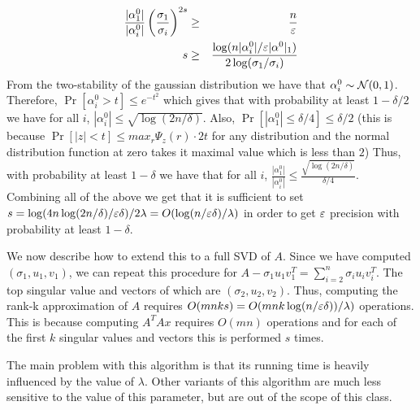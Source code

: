 \documentclass{article}
\begin{document}
\begin{eqnarray}
\frac{|\alpha^{0}_{1}|}{|\alpha^{0}_{i}|}\left(\frac{\sigma_1}{\sigma_i}\right)^{2s} &\ge& \frac{n}{\varepsilon}\\
s &\ge& \frac{\log(n|\alpha^{0}_i|/\varepsilon|\alpha^{0}|_1)}{2\log(\sigma_1/\sigma_i)}
\end{eqnarray}
From the two-stability of the gaussian distribution we have that $\alpha^{0}_i \sim {\mathcal{N}}(0,1)$. 
Therefore, $\Pr[\alpha^{0}_i > t] \le e^{-t^2}$ which gives that with probability at least $1-\delta/2$ we have for
all $i$, $|\alpha^{0}_i | \le \sqrt{\log(2n/\delta)}$. Also, $\Pr[|\alpha^{0}_1 | \le \delta/4 ] \le \delta/2$ (this is because 
$\Pr[|z| < t] \le max_{r}\Psi_{z}(r)\cdot2t$ for any distribution and the normal distribution function at zero takes it maximal value which is less than $2$) 
Thus, with probability at least $1-\delta$ we have that for all $i$, $\frac{|\alpha^{0}_{1}|}{|\alpha^{0}_{i}|} \le \frac{\sqrt{\log(2n/\delta)}}{\delta/4}$.
Combining all of the above we get that it is sufficient to set $s = \log(4n\log(2n/\delta)/\varepsilon\delta)/2\lambda = O(\log(n/\varepsilon\delta)/\lambda)$
in order to get $\varepsilon$ precision with probability at least $1-\delta$.

We now describe how to extend this to a full SVD of $A$. Since we have computed $(\sigma_1,u_1,v_1)$, we can repeat this
procedure for $A - \sigma_{1}u_{1}v_{1}^{T} = \sum_{i=2}^{n}{\sigma_{i}u_{i}v_{i}^{T}}$. The top singular value and vectors of which are $(\sigma_2,u_2,v_2)$.
Thus, computing the rank-k approximation of $A$ requires $O(mnks)  = O(mnk\log(n/\varepsilon\delta))/\lambda)$ operations. 
This is because computing $A^{T}Ax$ requires $O(mn)$ operations and
for each of the first $k$ singular values and vectors this is performed $s$ times. 

The main problem with this algorithm is that its running time is heavily influenced by the value of $\lambda$.
Other variants of this algorithm are much less sensitive to the value of this parameter, but are out of the scope of this class. 
\end{document}
